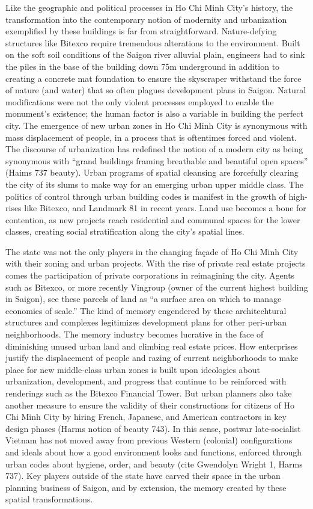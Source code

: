 Like the geographic and political processes in Ho Chi Minh City’s history, the transformation into the contemporary notion of modernity and urbanization exemplified by these buildings is far from straightforward. Nature-defying structures like Bitexco require tremendous alterations to the environment. Built on the soft soil conditions of the Saigon river alluvial plain, engineers had to sink the piles in the base of the building down 75m underground in addition to creating a concrete mat foundation to ensure the skyscraper withstand the force of nature (and water) that so often plagues development plans in Saigon.  Natural modifications were not the only violent processes employed to enable the monument’s existence; the human factor is also a variable in building the perfect city. The emergence of new urban zones in Ho Chi Minh City is synonymous with mass displacement of people, in a process that is oftentimes forced and violent.  The discourse of urbanization has redefined the notion of a modern city as being synonymous with “grand buildings framing breathable and beautiful open spaces” (Haims 737 beauty). Urban programs of spatial cleansing are forcefully clearing the city of its slums to make way for an emerging urban upper middle class.  The politics of control through urban building codes is manifest in the growth of high-rises like Bitexco, and Landmark 81 in recent years. Land use becomes a bone for contention, as new projects reach residential and communal spaces for the lower classes, creating social stratification along the city’s spatial lines.

The state was not the only players in the changing façade of Ho Chi Minh City with their zoning and urban projects. With the rise of private real estate projects comes the participation of private corporations in reimagining the city. Agents such as Bitexco, or more recently Vingroup (owner of the current highest building in Saigon), see these parcels of land as “a surface area on which to manage economies of scale.” The kind of memory engendered by these architechtural structures and complexes legitimizes development plans for other peri-urban neighborhoods. The memory industry becomes lucrative in the face of diminishing unused urban land and climbing real estate prices. How enterprises justify the displacement of people and razing of current neighborhoods to make place for new middle-class urban zones is built upon ideologies about urbanization, development, and progress that continue to be reinforced with renderings such as the Bitexco Financial Tower. But urban planners also take another measure to ensure the validity of their constructions for citizens of Ho Chi Minh City by hiring French, Japanese, and American contractors in key design phases (Harms notion of beauty 743). In this sense, postwar late-socialist Vietnam has not moved away from previous Western (colonial) configurations and ideals about how a good environment looks and functions, enforced through urban codes about hygiene, order, and beauty (cite Gwendolyn Wright 1, Harms 737). Key players outside of the state have carved their space in the urban planning business of Saigon, and by extension, the memory created by these spatial transformations.

